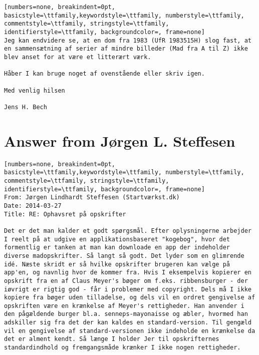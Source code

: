 \begin{lstlisting}[numbers=none, breakindent=0pt, basicstyle=\ttfamily,keywordstyle=\ttfamily, numberstyle=\ttfamily, commentstyle=\ttfamily, stringstyle=\ttfamily, identifierstyle=\ttfamily, backgroundcolor=, frame=none]
Jeg kan endvidere se, at en dom fra 1983 (UfR 1983515H) slog fast, at en sammensætning af serier af mindre billeder (Mad fra A til Z) ikke blev anset for at være et litterært værk.
 
Håber I kan bruge noget af ovenstående eller skriv igen.
 
Med venlig hilsen
 
Jens H. Bech
\end{lstlisting}

\newpage

\section*{Answer from Jørgen L. Steffesen}
\begin{lstlisting}[numbers=none, breakindent=0pt, basicstyle=\ttfamily,keywordstyle=\ttfamily, numberstyle=\ttfamily, commentstyle=\ttfamily, stringstyle=\ttfamily, identifierstyle=\ttfamily, backgroundcolor=, frame=none]
From: Jørgen Lindhardt Steffesen (Startværkst.dk)
Date: 2014-03-27
Title: RE: Ophavsret på opskrifter

Det er det man kalder et godt spørgsmål. Efter oplysningerne arbejder I reelt på at udgive en applikationsbaseret "kogebog", hvor det formentlig er tanken at man kan downloade en app der indeholder diverse madopskrifter. Så langt så godt. Det lyder som en glimrende idé. Næste skridt er så hvilke opskrifter brugeren kan vælge på app'en, og navnlig hvor de kommer fra. Hvis I eksempelvis kopierer en opskrift fra en af Claus Meyer's bøger om f.eks. ribbensburger - der iøvrigt er rigtig god - får i problemer med copyright. Dels må I ikke kopiere fra bøger uden tilladelse, og dels vil en ordret gengivelse af opskriften være en krænkelse af Meyer's rettigheder. Han anvender i den pågældende burger bl.a. senneps-mayonaisse og æbler, hvormed han adskiller sig fra det der kan kaldes en standard-version. Til gengæld vil en gengivelse af standard-versionen ikke indeholde en krænkelse da det er alment kendt. Så længe I holder Jer til opskrifternes standardindhold og fremgangsmåde krænker I ikke nogen rettigheder.
\end{lstlisting}